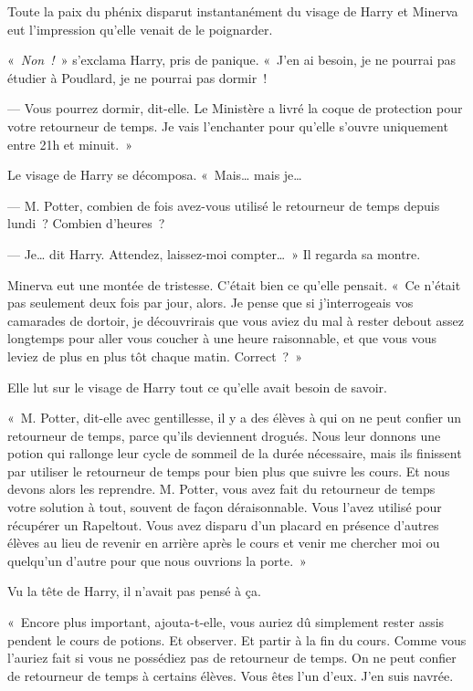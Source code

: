Toute la paix du phénix disparut instantanément du visage de Harry et Minerva eut l'impression qu'elle venait de le poignarder.

«~\emph{Non~!}~» s'exclama Harry, pris de panique.
«~J'en ai besoin, je ne pourrai pas étudier à Poudlard, je ne pourrai pas dormir~!

--- Vous pourrez dormir, dit-elle.
Le Ministère a livré la coque de protection pour votre retourneur de temps.
Je vais l'enchanter pour qu'elle s'ouvre uniquement entre 21h et minuit.~»

Le visage de Harry se décomposa.
«~Mais… mais je…

--- M. Potter, combien de fois avez-vous utilisé le retourneur de temps depuis lundi~?
Combien d'heures~?

--- Je… dit Harry.
Attendez, laissez-moi compter…~»
Il regarda sa montre.

Minerva eut une montée de tristesse.
C'était bien ce qu'elle pensait.
«~Ce n'était pas seulement deux fois par jour, alors.
Je pense que si j'interrogeais vos camarades de dortoir, je découvrirais que vous aviez du mal à rester debout assez longtemps pour aller vous coucher à une heure raisonnable, et que vous vous leviez de plus en plus tôt chaque matin.
Correct~?~»

Elle lut sur le visage de Harry tout ce qu'elle avait besoin de savoir.

«~M. Potter, dit-elle avec gentillesse, il y a des élèves à qui on ne peut confier un retourneur de temps, parce qu'ils deviennent drogués.
Nous leur donnons une potion qui rallonge leur cycle de sommeil de la durée nécessaire, mais ils finissent par utiliser le retourneur de temps pour bien plus que suivre les cours.
Et nous devons alors les reprendre.
M. Potter, vous avez fait du retourneur de temps votre solution à tout, souvent de façon déraisonnable.
Vous l'avez utilisé pour récupérer un Rapeltout.
Vous avez disparu d'un placard en présence d'autres élèves au lieu de revenir en arrière après le cours et venir me chercher moi ou quelqu'un d'autre pour que nous ouvrions la porte.~»

Vu la tête de Harry, il n'avait pas pensé à ça.

«~Encore plus important, ajouta-t-elle, vous auriez dû simplement rester assis pendent le cours de potions.
Et observer.
Et partir à la fin du cours.
Comme vous l'auriez fait si vous ne possédiez pas de retourneur de temps.
On ne peut confier de retourneur de temps à certains élèves.
Vous êtes l'un d'eux.
J'en suis navrée.

